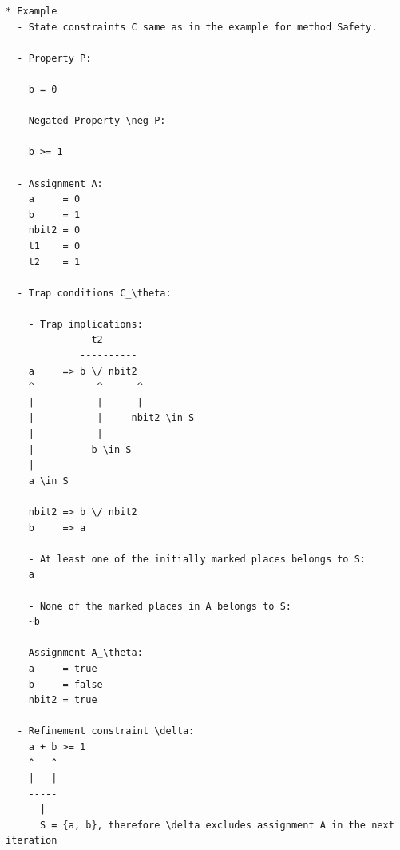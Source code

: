 \documentclass{llncs}
\begin{document}
\newpage
\begin{verbatim}
* Example
  - State constraints C same as in the example for method Safety.
 
  - Property P:

    b = 0 
  
  - Negated Property \neg P:
    
    b >= 1

  - Assignment A:
    a     = 0
    b     = 1
    nbit2 = 0
    t1    = 0
    t2    = 1

  - Trap conditions C_\theta:

    - Trap implications:
               t2
             ----------
    a     => b \/ nbit2
    ^           ^      ^
    |           |      |
    |           |     nbit2 \in S
    |           |
    |          b \in S
    |
    a \in S
    
    nbit2 => b \/ nbit2
    b     => a

    - At least one of the initially marked places belongs to S:
    a

    - None of the marked places in A belongs to S:
    ~b
  
  - Assignment A_\theta:
    a     = true
    b     = false
    nbit2 = true

  - Refinement constraint \delta:
    a + b >= 1
    ^   ^
    |   |
    -----
      |
      S = {a, b}, therefore \delta excludes assignment A in the next iteration
\end{verbatim}

\newpage
\end{document}
